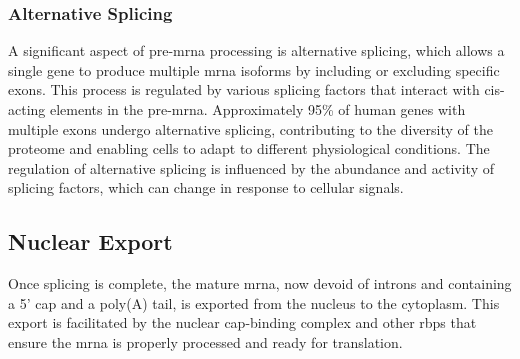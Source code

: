 \subsubsection{Alternative Splicing}
A significant aspect of pre-\gls{mrna} processing is alternative splicing,
which allows a single gene to produce multiple \gls{mrna} isoforms by including
or excluding specific exons.
This process is regulated by various splicing factors that interact with
cis-acting elements in the
pre-\gls{mrna}\supercite{le_alternative_2015,murphy_therapeutic_2022}.
Approximately 95\% of human genes with multiple exons undergo alternative
splicing, contributing to the diversity of the proteome and enabling cells to
adapt to different physiological conditions\supercite{le_alternative_2015}.
The regulation of alternative splicing is influenced by the abundance and
activity of splicing factors, which can change in response to cellular
signals\supercite{wang_mechanism_2015}.

\subsection{Nuclear Export}
Once splicing is complete, the mature \gls{mrna}, now devoid of introns and
containing a 5' cap and a poly(A) tail, is exported from the nucleus to the
cytoplasm.
This export is facilitated by the nuclear cap-binding complex and other
\glspl{rbp} that ensure the \gls{mrna} is properly processed and ready for
translation\supercite{soucek_evolutionarily_2016}.
